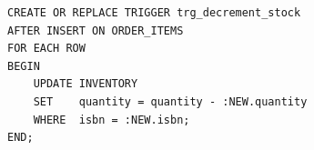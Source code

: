 \begin{lstlisting}[caption={trg\_decrement\_stock trigger}]
CREATE OR REPLACE TRIGGER trg_decrement_stock
AFTER INSERT ON ORDER_ITEMS
FOR EACH ROW
BEGIN
    UPDATE INVENTORY
    SET    quantity = quantity - :NEW.quantity
    WHERE  isbn = :NEW.isbn;
END;
\end{lstlisting}